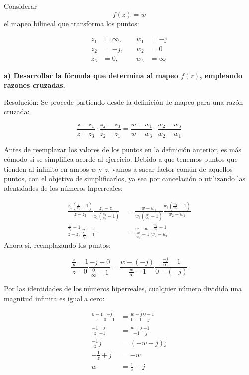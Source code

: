 \documentclass[12pt,a4paper]{report}
\begin{document}
Considerar $$ f(z) = w $$ el mapeo bilineal que transforma los puntos:

\begin{align*}
    z_1 &= \infty, \quad & w_1 &= -j \\
    z_2 &= -j, \quad & w_2 &= 0 \\
    z_3 &= 0, \quad & w_3 &= \infty 
\end{align*}

\textbf{a) Desarrollar la fórmula que determina al mapeo \( f(z) \), empleando razones cruzadas.}

Resolución: Se procede partiendo desde la definición de mapeo para una razón cruzada:

$$ \frac{z - z_1}{z - z_3} \cdot \frac{z_2 - z_3}{z_2 - z_1} = \frac{w - w_1}{w - w_3} \cdot \frac{w_2 - w_3}{w_2 - w_1} $$

Antes de reemplazar los valores de los puntos en la definición anterior, es más cómodo si se simplifica acorde al ejercicio. Debido a que tenemos puntos que tienden al infinito en ambos \( w \) y \( z \), vamos a sacar factor común de aquellos puntos, con el objetivo de simplificarlos, ya sea por cancelación o utilizando las identidades de los números hiperreales:

\begin{align*}
    \frac{z_1 \left(\frac{z}{z_1}-1\right) }{z-z_3} \frac{z_2-z_3}{z_1 \left( \frac{z_3}{z_2} -1 \right) } &= \frac{w-w_1}{w_3 \left( \frac{w}{w_3} - 1 \right)} \frac{w_3 \left( \frac{w_1}{w_3} -1 \right) }{w_2-w_1}\\[10pt]
    \frac{\frac{z}{z_1} -1}{z-z_3} \frac{z_2-z_3}{\frac{z_3}{z_1}-1} &= \frac{w-w_1}{\frac{w}{w_3}-1} \frac{\frac{w_1}{w_3}-1}{w_2-w_1}
\end{align*}
Ahora si, reemplazando los puntos:

$$\frac{\frac{z}{\infty}-1}{z-0} \frac{-j-0}{\frac{0}{\infty}-1} = \frac{w-(-j)}{\frac{w}{\infty}-1} \frac{\frac{-j}{\infty}-1}{0-(-j)}$$

Por las identidades de los números hiperreales, cualquier número dividido una magnitud infinita es igual a cero:

\begin{align*}
    \frac{0-1}{z} \frac{-j}{0-1} &= \frac{w+j}{0-1} \frac{0-1}{j}\\
    \frac{-1}{z} \frac{-j}{-1} &= \frac{w+j}{-1} \frac{-1}{j}\\
    \frac{-1}{z}j &= (-w-j)j\\
    -\frac{1}{z}+j &= -w\\
    w &= \frac{1}{z}-j
\end{align*}
\end{document}
